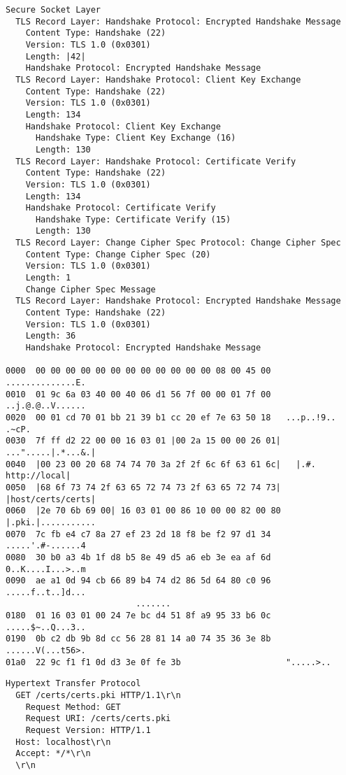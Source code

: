 \begin{lstlisting}[caption={Mensagem \tlsHsCu}]
Secure Socket Layer
  TLS Record Layer: Handshake Protocol: Encrypted Handshake Message
    Content Type: Handshake (22)
    Version: TLS 1.0 (0x0301)
    Length: |42|
    Handshake Protocol: Encrypted Handshake Message
  TLS Record Layer: Handshake Protocol: Client Key Exchange
    Content Type: Handshake (22)
    Version: TLS 1.0 (0x0301)
    Length: 134
    Handshake Protocol: Client Key Exchange
      Handshake Type: Client Key Exchange (16)
      Length: 130
  TLS Record Layer: Handshake Protocol: Certificate Verify
    Content Type: Handshake (22)
    Version: TLS 1.0 (0x0301)
    Length: 134
    Handshake Protocol: Certificate Verify
      Handshake Type: Certificate Verify (15)
      Length: 130
  TLS Record Layer: Change Cipher Spec Protocol: Change Cipher Spec
    Content Type: Change Cipher Spec (20)
    Version: TLS 1.0 (0x0301)
    Length: 1
    Change Cipher Spec Message
  TLS Record Layer: Handshake Protocol: Encrypted Handshake Message
    Content Type: Handshake (22)
    Version: TLS 1.0 (0x0301)
    Length: 36
    Handshake Protocol: Encrypted Handshake Message

0000  00 00 00 00 00 00 00 00 00 00 00 00 08 00 45 00   ..............E.
0010  01 9c 6a 03 40 00 40 06 d1 56 7f 00 00 01 7f 00   ..j.@.@..V......
0020  00 01 cd 70 01 bb 21 39 b1 cc 20 ef 7e 63 50 18   ...p..!9.. .~cP.
0030  7f ff d2 22 00 00 16 03 01 |00 2a 15 00 00 26 01|   ...".....|.*...&.|
0040  |00 23 00 20 68 74 74 70 3a 2f 2f 6c 6f 63 61 6c|   |.#. http://local|
0050  |68 6f 73 74 2f 63 65 72 74 73 2f 63 65 72 74 73|   |host/certs/certs|
0060  |2e 70 6b 69 00| 16 03 01 00 86 10 00 00 82 00 80   |.pki.|...........
0070  7c fb e4 c7 8a 27 ef 23 2d 18 f8 be f2 97 d1 34   .....'.#-......4
0080  30 b0 a3 4b 1f d8 b5 8e 49 d5 a6 eb 3e ea af 6d   0..K....I...>..m
0090  ae a1 0d 94 cb 66 89 b4 74 d2 86 5d 64 80 c0 96   .....f..t..]d...
                          .......
0180  01 16 03 01 00 24 7e bc d4 51 8f a9 95 33 b6 0c   .....$~..Q...3..
0190  0b c2 db 9b 8d cc 56 28 81 14 a0 74 35 36 3e 8b   ......V(...t56>.
01a0  22 9c f1 f1 0d d3 3e 0f fe 3b                     ".....>..
\end{lstlisting}

\begin{lstlisting}[caption={Solicitação HTTP enviada pela aplicação \texttt{s\_server}}]
Hypertext Transfer Protocol
  GET /certs/certs.pki HTTP/1.1\r\n
    Request Method: GET
    Request URI: /certs/certs.pki
    Request Version: HTTP/1.1
  Host: localhost\r\n
  Accept: */*\r\n
  \r\n
\end{lstlisting}

